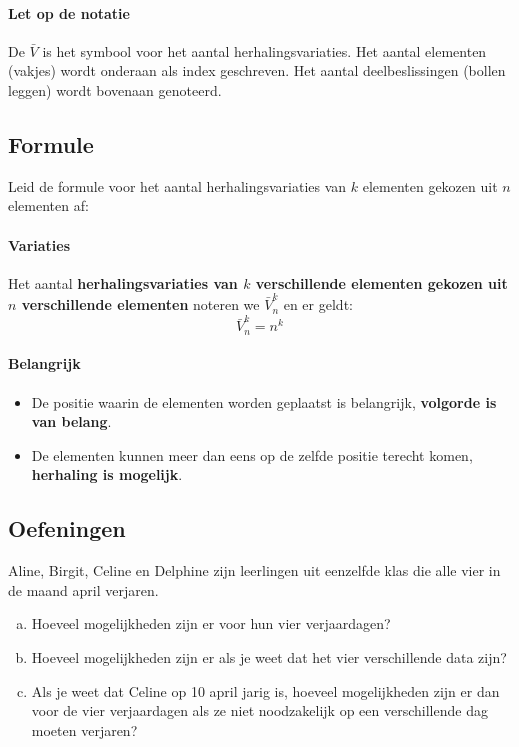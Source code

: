 \documentclass[12pt,twoside]{article}
\begin{document}
\paragraph*{Let op de notatie}
De $\bar{V}$ is het symbool voor het aantal herhalingsvariaties.
Het aantal elementen (vakjes) wordt onderaan als index geschreven. Het aantal
deelbeslissingen (bollen leggen) wordt bovenaan genoteerd.

\pagebreak
\subsection{Formule}

\begin{oefening}
Leid de formule voor het aantal herhalingsvariaties van $k$ elementen gekozen uit $n$ elementen af:
\end{oefening}

\paragraph*{Variaties}
\begin{mdframed}
Het aantal {\bf herhalingsvariaties van $k$ verschillende elementen gekozen uit $n$ verschillende elementen} noteren we $\bar{V}^k_n$ en er geldt:
$$\bar{V}^k_n=n^k$$
\end{mdframed}

\paragraph*{Belangrijk}
\begin{itemize}
  \item De positie waarin de elementen worden geplaatst is belangrijk, {\bf volgorde is van belang}.
  \item De elementen kunnen meer dan eens op de zelfde positie terecht komen, {\bf herhaling is mogelijk}.
\end{itemize}

\subsection{Oefeningen}

\begin{oefening}
Aline, Birgit, Celine en Delphine zijn leerlingen uit eenzelfde klas die alle vier in de maand april verjaren.
\begin{enumerate}[(a)]
  \item Hoeveel mogelijkheden zijn er voor hun vier verjaardagen?
  \item Hoeveel mogelijkheden zijn er als je weet dat het vier verschillende data zijn?
  \item Als je weet dat Celine op 10 april jarig is, hoeveel mogelijkheden zijn er dan voor de vier verjaardagen als ze niet noodzakelijk op een verschillende dag moeten verjaren?
\end{enumerate}
\end{oefening}
\end{document}
